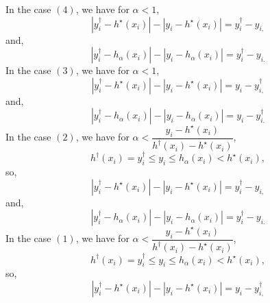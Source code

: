 \documentclass{article}
\begin{document}
In the case $\left(4\right)$, we have for $\alpha < 1$,
\begin{equation} 
\left| y^{\dagger}_{i} - h^\star \left(x_{i}\right) \right| - \left| y_{i} - h^\star \left(x_{i}\right) \right| = y^{\dagger}_{i} - y_{i,}
\end{equation}
and,
\begin{equation} 
\left| y^{\dagger}_{i} - h_{\alpha}\left(x_{i}\right) \right| - \left| y_{i} - h_{\alpha}\left(x_{i}\right) \right| = y^{\dagger}_{i} - y_{i.}
\end{equation}
In the case $\left(3\right)$, we have for $\alpha < 1$,
\begin{equation} 
\left| y^{\dagger}_{i} - h^\star \left(x_{i}\right) \right| - \left| y_{i} - h^\star \left(x_{i}\right) \right| = y_{i} - y^{\dagger}_{i,}
\end{equation}
and,
\begin{equation} 
\left| y^{\dagger}_{i} - h_{\alpha}\left(x_{i}\right) \right| - \left| y_{i} - h_{\alpha}\left(x_{i}\right) \right| = y_{i} - y^{\dagger}_{i.}
\end{equation}
In the case $\left(2\right)$, we have for $\alpha < \dfrac{y_{i} - h^\star \left(x_{i}\right)}{h^{\dagger}\left(x_{i}\right) - h^\star \left(x_{i}\right)}$,
\begin{equation} 
h^{\dagger}\left(x_{i}\right) = y^{\dagger}_{i} \leq  y_{i} \leq  h_{\alpha}\left(x_{i}\right) < h^\star \left(x_{i}\right),
\end{equation}
so,
\begin{equation} 
\left| y^{\dagger}_{i} - h^\star \left(x_{i}\right) \right| - \left| y_{i} - h^\star \left(x_{i}\right) \right| =  y^{\dagger}_{i} - y_{i,}
\end{equation}
and,
\begin{equation} 
\left| y^{\dagger}_{i} - h_{\alpha}\left(x_{i}\right) \right| - \left| y_{i} - h_{\alpha}\left(x_{i}\right) \right| = y^{\dagger}_{i} - y_{i.}
\end{equation}
In the case $\left(1\right)$, we have for $\alpha < \dfrac{y_{i} - h^\star \left(x_{i}\right)}{h^{\dagger}\left(x_{i}\right) - h^\star \left(x_{i}\right)}$,
\begin{equation} 
h^{\dagger}\left(x_{i}\right) = y^{\dagger}_{i} \leq  y_{i} \leq  h_{\alpha}\left(x_{i}\right) < h^\star \left(x_{i}\right),
\end{equation}
so,
\begin{equation} 
\left| y^{\dagger}_{i} - h^\star \left(x_{i}\right) \right| - \left| y_{i} - h^\star \left(x_{i}\right) \right| =  y_{i} - y^{\dagger}_{i,}
\end{equation}
\end{document}
